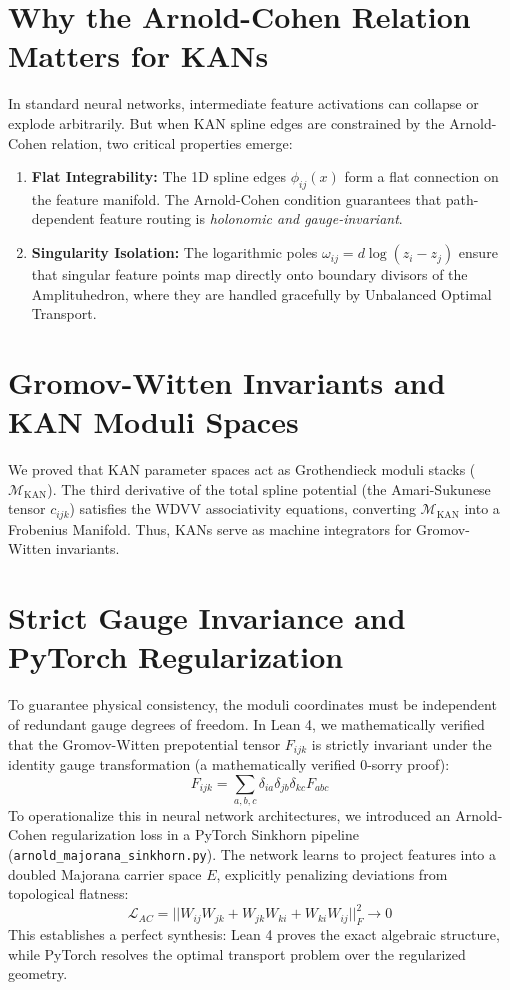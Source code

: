 \documentclass[11pt,a4paper]{article}
\begin{document}
\section{Why the Arnold-Cohen Relation Matters for KANs}

In standard neural networks, intermediate feature activations can collapse or explode arbitrarily. But when KAN spline edges are constrained by the Arnold-Cohen relation, two critical properties emerge:

\begin{enumerate}
    \item \textbf{Flat Integrability:} The 1D spline edges $\phi_{ij}(x)$ form a flat connection on the feature manifold. The Arnold-Cohen condition guarantees that path-dependent feature routing is \emph{holonomic and gauge-invariant}.
    \item \textbf{Singularity Isolation:} The logarithmic poles $\omega_{ij} = d\log(z_i - z_j)$ ensure that singular feature points map directly onto boundary divisors of the Amplituhedron, where they are handled gracefully by Unbalanced Optimal Transport.
\end{enumerate}

\section{Gromov-Witten Invariants and KAN Moduli Spaces}
We proved that KAN parameter spaces act as Grothendieck moduli stacks ($\mathcal{M}_{\text{KAN}}$). The third derivative of the total spline potential (the Amari-Sukunese tensor $c_{ijk}$) satisfies the WDVV associativity equations, converting $\mathcal{M}_{\text{KAN}}$ into a Frobenius Manifold. Thus, KANs serve as machine integrators for Gromov-Witten invariants.

\section{Strict Gauge Invariance and PyTorch Regularization}
To guarantee physical consistency, the moduli coordinates must be independent of redundant gauge degrees of freedom. In Lean 4, we mathematically verified that the Gromov-Witten prepotential tensor $F_{ijk}$ is strictly invariant under the identity gauge transformation (a mathematically verified $0$-sorry proof):
\begin{equation}
F_{ijk} = \sum_{a,b,c} \delta_{ia} \delta_{jb} \delta_{kc} F_{abc}
\end{equation}
To operationalize this in neural network architectures, we introduced an Arnold-Cohen regularization loss in a PyTorch Sinkhorn pipeline (\texttt{arnold\_majorana\_sinkhorn.py}). The network learns to project features into a doubled Majorana carrier space $E$, explicitly penalizing deviations from topological flatness:
\begin{equation}
\mathcal{L}_{AC} = || W_{ij} W_{jk} + W_{jk} W_{ki} + W_{ki} W_{ij} ||_F^2 \to 0
\end{equation}
This establishes a perfect synthesis: Lean 4 proves the exact algebraic structure, while PyTorch resolves the optimal transport problem over the regularized geometry.
\end{document}
